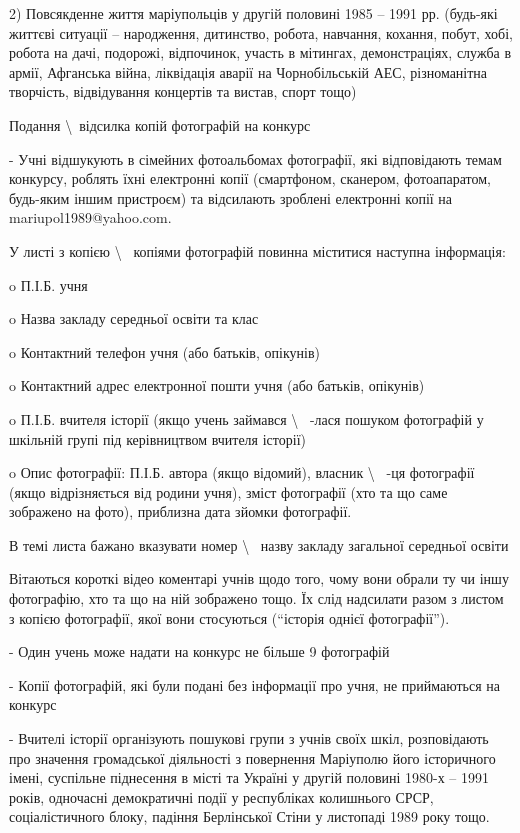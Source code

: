 2) Повсякденне життя маріупольців у другій половині 1985 – 1991 рр. (будь-які
життєві ситуації – народження, дитинство, робота, навчання, кохання, побут,
хобі, робота на дачі, подорожі, відпочинок, участь в мітингах, демонстраціях,
служба в армії, Афганська війна, ліквідація аварії на Чорнобільській АЕС,
різноманітна творчість, відвідування концертів та вистав, спорт тощо)


Подання \textbackslash~відсилка копій фотографій на конкурс

- Учні відшукують в сімейних фотоальбомах фотографії, які відповідають темам конкурсу, роблять їхні електронні копії (смартфоном, сканером, фотоапаратом, будь-яким іншим пристроєм) та відсилають зроблені електронні копії на 📧 mariupol1989@yahoo.com.

У листі з копією \textbackslash~ копіями фотографій повинна міститися наступна інформація:

o П.І.Б. учня\par
o Назва закладу середньої освіти та клас\par
o Контактний телефон учня (або батьків, опікунів)\par
o Контактний адрес електронної пошти учня (або батьків, опікунів)\par
o П.І.Б. вчителя історії (якщо учень займався \textbackslash~ -лася пошуком фотографій у шкільній групі під керівництвом вчителя історії)\par
o Опис фотографії: П.І.Б. автора (якщо відомий), власник \textbackslash~ -ця фотографії (якщо відрізняється від родини учня), зміст фотографії (хто та що саме зображено на фото), приблизна дата зйомки фотографії.\par

В темі листа бажано вказувати номер \textbackslash~ назву закладу загальної середньої освіти

Вітаються короткі відео коментарі учнів щодо того, чому вони обрали ту чи іншу
фотографію, хто та що на ній зображено тощо. Їх слід надсилати разом з листом з
копією фотографії, якої вони стосуються (\enquote{історія однієї фотографії}).

-  Один учень може надати на конкурс не більше 9 фотографій

-  Копії фотографій, які були подані без інформації про учня, не приймаються на конкурс

-  Вчителі історії організують пошукові групи з учнів своїх шкіл, розповідають
про значення громадської діяльності з повернення Маріуполю його історичного
імені, суспільне піднесення в місті та Україні у другій половині 1980-х – 1991
років, одночасні демократичні події у республіках колишнього СРСР,
соціалістичного блоку, падіння Берлінської Стіни у листопаді 1989 року тощо.

